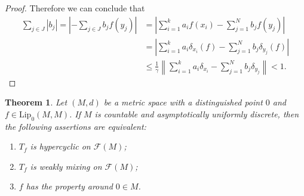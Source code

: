 \documentclass[12pt,english]{amsart}
\numberwithin{equation}{section}
\theoremstyle{plain}
\newtheorem{theorem}{Theorem}[section]
\theoremstyle{definition}
\def\aim{\text{targeting}{}}
\newcommand{\free}[1]{\mathcal{F}(#1)}
\begin{document}
\begin{proof}
Therefore we can conclude that
\begin{align*}
\sum_{j\in J}|b_j|
=\left|-\sum_{j\in J}b_jf(y_j)\right|
&=\left|\sum_{i=1}^k a_if(x_i)-\sum_{j=1}^{N}b_jf(y_j)\right|\\
&=\left|\sum_{i=1}^k a_i\delta_{x_i}(f)-\sum_{j=1}^{N}b_j\delta_{y_j}(f)\right|\\
&\le \frac{1}{\gamma}\left\|\sum_{i=1}^k a_i\delta_{x_i}-\sum_{j=1}^{N}b_j \delta_{y_j}\right\|< 1.
\end{align*}
\end{proof}


\begin{theorem}\label{hypdeltas2}
Let $(M,d)$ be a metric space with a distinguished point $0$ and $f\in \text{Lip}_0(M,M)$. If $M$ is countable and asymptotically uniformly discrete, then the following assertions are equivalent:
\begin{enumerate}
\item $T_f$ is hypercyclic on $\free{M}$;
\item $T_f$ is weakly mixing on $\free{M}$;
\item $f$ has the \aim{} property around $0\in M$.
\end{enumerate}
\end{theorem}
\end{document}
